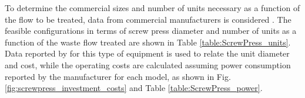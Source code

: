 \begin{refsection}[referencesCh4]
To determine the commercial sizes and number of units necessary as a function of the flow to be treated, data from commercial manufacturers is considered \citep{PWTech}. The feasible configurations in terms of screw press diameter and number of units as a function of the waste flow treated are shown in Table \ref{table:ScrewPress_units}. Data reported by \citet{Matches} for this type of equipment is used to relate the unit diameter and cost, while the operating costs are calculated assuming power consumption reported by the manufacturer for each model, as shown in Fig. \ref{fig:screwpress_investment_costs} and Table \ref{table:ScrewPress_power}.
\begin{table}[h] 
		\centering
		\caption{Sizing estimated for screw press units based commercial on data \protect\citep{PWTech}} \label{table:ScrewPress_units}
\end{table}


\end{refsection}
